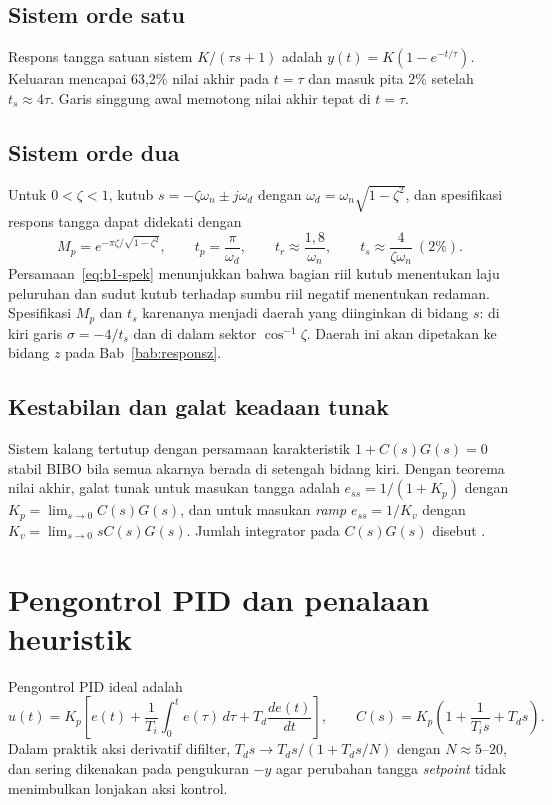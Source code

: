 \subsection{Sistem orde satu}
Respons tangga satuan sistem $K/(\tau s+1)$ adalah $y(t) = K(1-e^{-t/\tau})$. Keluaran mencapai 63,2\% nilai akhir pada $t=\tau$ dan masuk pita 2\% setelah $t_s \approx 4\tau$. Garis singgung awal memotong nilai akhir tepat di $t=\tau$.

\subsection{Sistem orde dua}
Untuk $0<\zeta<1$, kutub $s = -\zeta\omega_n \pm j\omega_d$ dengan $\omega_d = \omega_n\sqrt{1-\zeta^2}$, dan spesifikasi respons tangga dapat didekati dengan
\begin{equation}
	M_p = e^{-\pi\zeta/\sqrt{1-\zeta^2}},\qquad t_p = \frac{\pi}{\omega_d},\qquad t_r \approx \frac{1{,}8}{\omega_n},\qquad t_s \approx \frac{4}{\zeta\omega_n}\ (2\%).
	\label{eq:b1-spek}
\end{equation}
Persamaan~\eqref{eq:b1-spek} menunjukkan bahwa bagian riil kutub menentukan laju peluruhan dan sudut kutub terhadap sumbu riil negatif menentukan redaman. Spesifikasi $M_p$ dan $t_s$ karenanya menjadi daerah yang diinginkan di bidang $s$: di kiri garis $\sigma = -4/t_s$ dan di dalam sektor $\cos^{-1}\zeta$. Daerah ini akan dipetakan ke bidang $z$ pada Bab~\ref{bab:responsz}.

\subsection{Kestabilan dan galat keadaan tunak}
Sistem kalang tertutup dengan persamaan karakteristik $1 + C(s)G(s) = 0$ stabil BIBO bila semua akarnya berada di setengah bidang kiri. Dengan teorema nilai akhir, galat tunak untuk masukan tangga adalah $e_{ss} = 1/(1+K_p)$ dengan $K_p = \lim_{s\to0}C(s)G(s)$, dan untuk masukan \textit{ramp} $e_{ss} = 1/K_v$ dengan $K_v = \lim_{s\to0}sC(s)G(s)$. Jumlah integrator pada $C(s)G(s)$ disebut .

\section{Pengontrol PID dan penalaan heuristik}
Pengontrol PID ideal adalah
\begin{equation}
	u(t) = K_p\left[e(t) + \frac{1}{T_i}\int_0^t e(\tau)\,d\tau + T_d\frac{de(t)}{dt}\right],\qquad
	C(s) = K_p\left(1 + \frac{1}{T_is} + T_ds\right).
\end{equation}
Dalam praktik aksi derivatif difilter, $T_ds \rightarrow T_ds/(1+T_ds/N)$ dengan $N \approx 5$--$20$, dan sering dikenakan pada pengukuran $-y$ agar perubahan tangga \textit{setpoint} tidak menimbulkan lonjakan aksi kontrol.

